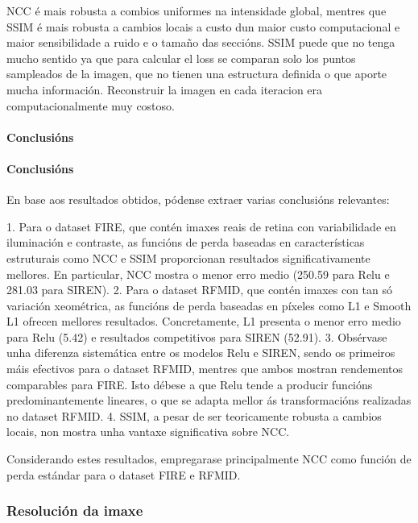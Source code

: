 NCC é mais robusta a combios uniformes na intensidade global, mentres que SSIM é mais robusta a cambios locais a custo dun maior custo computacional e maior sensibilidade a ruido e o tamaño das seccións.
SSIM puede que no tenga mucho sentido ya que para calcular el loss se comparan solo los puntos sampleados de la imagen, que no tienen una estructura definida o que aporte mucha información.
Reconstruir la imagen en cada iteracion era computacionalmente muy costoso.
\paragraph{Conclusións}
\label{par:Conclusións}

\paragraph{Conclusións}
\label{par:Conclusións}

En base aos resultados obtidos, pódense extraer varias conclusións relevantes:

1. Para o dataset FIRE, que contén imaxes reais de retina con variabilidade en iluminación e contraste, as funcións de perda baseadas en características estruturais como NCC e SSIM proporcionan resultados significativamente mellores. En particular, NCC mostra o menor erro medio (250.59 para Relu e 281.03 para SIREN).
2. Para o dataset RFMID, que contén imaxes con tan só variación xeométrica, as funcións de perda baseadas en píxeles como L1 e Smooth L1 ofrecen mellores resultados. Concretamente, L1 presenta o menor erro medio para Relu (5.42) e resultados competitivos para SIREN (52.91).
3. Obsérvase unha diferenza sistemática entre os modelos Relu e SIREN, sendo os primeiros máis efectivos para o dataset RFMID, mentres que ambos mostran rendementos comparables para FIRE. Isto débese a que Relu tende a producir funcións predominantemente lineares, o que se adapta mellor ás transformacións realizadas no dataset RFMID.
4. SSIM, a pesar de ser teoricamente robusta a cambios locais, non mostra unha vantaxe significativa sobre NCC.

Considerando estes resultados, empregarase principalmente NCC como función de perda estándar para o dataset FIRE e RFMID.

\subsubsection{Resolución da imaxe}
\label{subsubsec:Resolución da imaxe}

